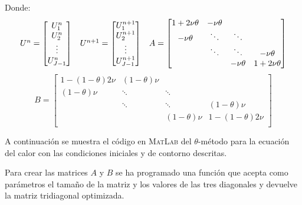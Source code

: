\documentclass[spanish]{mathnotes}
\begin{document}
	Donde:
	\begin{equation*}
		\begin{array}{l c r}
				U^n = \begin{bmatrix}
				U_1^{n}\\
				U_2^{n}\\
				\vdots\\
				U_{J-1}^{n}\\
				\end{bmatrix}
				&
				U^{n+1} = \begin{bmatrix}
				U_1^{n+1}\\
				U_2^{n+1}\\
				\vdots\\
				U_{J-1}^{n+1}\\
				\end{bmatrix}
				&
				A =
				\begin{bmatrix}
				1+2\nu\theta & -\nu\theta &        & \\
				-\nu\theta   & \ddots     & \ddots & \\
				& \ddots     & \ddots     & -\nu\theta\\
				&            & -\nu\theta & 1+2\nu\theta\\
				\end{bmatrix}
		\end{array}
	\end{equation*}
	\begin{equation*}
	B = 
	\begin{bmatrix}
	1-(1-\theta)2\nu         & (1-\theta)\nu&        & \\
	(1-\theta)\nu            & \ddots       & \ddots & \\
	& \ddots & \ddots        & (1-\theta)\nu\\
	&        & (1-\theta)\nu & 1-(1-\theta)2\nu\\
	\end{bmatrix}
	\end{equation*}
		
	A continuación se muestra el código en \textsc{MatLab} del $\theta$-método para la ecuación del calor con las condiciones iniciales y de contorno descritas.
	
	
	\lstset{style=matlabStyle}
	
	
	\newpage
	Para crear las matrices $A$ y $B$ se ha programado una función que acepta como parámetros el tamaño de la matriz y los valores de las tres diagonales y devuelve la matriz tridiagonal optimizada.
	\lstset{style=matlabStyle}
	
	
\end{document}

